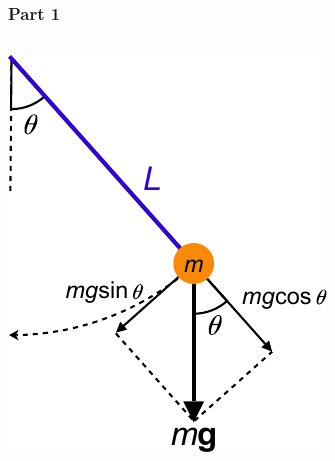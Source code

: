 \documentclass[pdf,handout, hideothersubsections]{beamer}
\begin{document}
\begingroup
\footnotesize
\begin{frame}
\frametitle{Part 1}
\begin{columns}[T]

  \begin{column}{0.3\textwidth}
     \includegraphics[width=\textwidth]{Simple_pendulum_generalized_coordinates.pdf}


\end{column}
\end{columns}
\end{frame}
\end{document}
